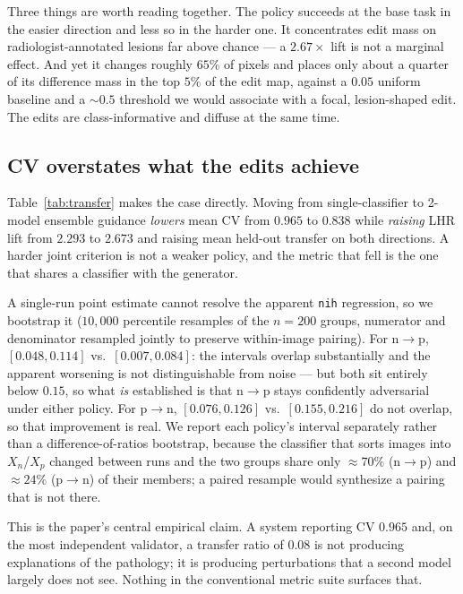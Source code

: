 \documentclass[10pt,twocolumn,letterpaper]{article}
\begin{document}
Three things are worth reading together. The policy succeeds at the base
task in the easier direction and less so in the harder one. It
concentrates edit mass on radiologist-annotated lesions far above chance
--- a $2.67\times$ lift is not a marginal effect. And yet it changes
roughly $65\%$ of pixels and places only about a quarter of its
difference mass in the top $5\%$ of the edit map, against a $0.05$
uniform baseline and a $\sim\!0.5$ threshold we would associate with a
focal, lesion-shaped edit. The edits are class-informative and diffuse
at the same time.

\subsection{CV overstates what the edits achieve}
\label{sec:overstates}
Table~\ref{tab:transfer} makes the case directly. Moving from
single-classifier to 2-model ensemble guidance \emph{lowers} mean CV
from $0.965$ to $0.838$ while \emph{raising} LHR lift from $2.293$ to
$2.673$ and raising mean held-out transfer on both directions. A harder
joint criterion is not a weaker policy, and the metric that fell is the
one that shares a classifier with the generator.

A single-run point estimate cannot resolve the apparent \texttt{nih}
regression, so we bootstrap it ($10{,}000$ percentile resamples of the
$n=200$ groups, numerator and denominator resampled jointly to preserve
within-image pairing). For n$\to$p, $[0.048,0.114]$ vs.\ $[0.007,0.084]$:
the intervals overlap substantially and the apparent worsening is not
distinguishable from noise --- but both sit entirely below $0.15$, so
what \emph{is} established is that n$\to$p stays confidently adversarial
under either policy. For p$\to$n, $[0.076,0.126]$ vs.\ $[0.155,0.216]$ do
not overlap, so that improvement is real. We report each policy's
interval separately rather than a difference-of-ratios bootstrap, because
the classifier that sorts images into $X_n$/$X_p$ changed between runs
and the two groups share only $\approx70\%$ (n$\to$p) and $\approx24\%$
(p$\to$n) of their members; a paired resample would synthesize a pairing
that is not there.

This is the paper's central empirical claim. A system reporting CV
$0.965$ and, on the most independent validator, a transfer ratio of
$0.08$ is not producing explanations of the pathology; it is producing
perturbations that a second model largely does not see. Nothing in the
conventional metric suite surfaces that.
\end{document}
